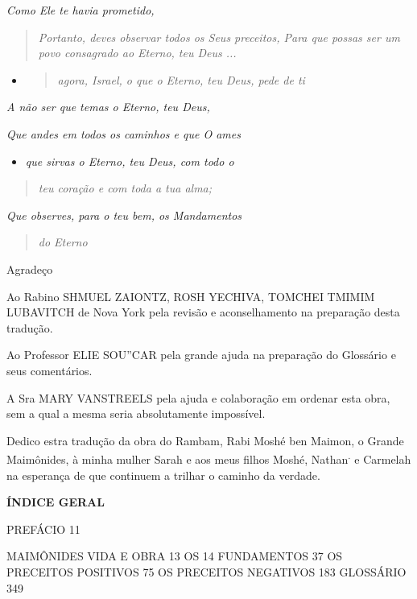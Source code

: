 \emph{Como Ele te havia prometido,}

\begin{quote}
\emph{Portanto, deves observar todos os Seus preceitos, Para que possas
ser um povo consagrado ao Eterno, teu Deus ...}
\end{quote}

\begin{itemize}
\item
  \begin{quote}
  \emph{agora, Israel, o que o Eterno, teu Deus, pede de ti}
  \end{quote}
\end{itemize}

\emph{A não ser que temas o Eterno, teu Deus,}

\emph{Que andes em todos os caminhos e que O ames}

\begin{itemize}
\item
  \emph{que sirvas o Eterno, teu Deus, com todo o}
\end{itemize}

\begin{quote}
\emph{teu coração e com toda a tua alma;}
\end{quote}

\emph{Que observes, para o teu bem, os Mandamentos}

\begin{quote}
\emph{do Eterno}
\end{quote}

Agradeço

Ao Rabino SHMUEL ZAIONTZ, ROSH YECHIVA, TOMCHEI TMIMIM LUBAVITCH de Nova
York pela revisão e aconselhamento na preparação desta tradução.

Ao Professor ELIE SOU''CAR pela grande ajuda na preparação do Glossário
e seus comentários.

A Sra MARY VANSTREELS pela ajuda e colabora­ção em ordenar esta obra,
sem a qual a mesma se­ria absolutamente impossível.

Dedico estra tradução da obra do Rambam, Rabi Moshé ben Maimon, o Grande
Maimônides, à minha mulher Sarah e aos meus filhos Moshé,
Nathan\textsuperscript{.} e Carmelah na esperança de que continuem a
trilhar o caminho da verdade.

\textbf{ÍNDICE GERAL}

PREFÁCIO 11

MAIMÔNIDES VIDA E OBRA 13 OS 14 FUNDAMENTOS 37 OS PRECEITOS POSITIVOS 75
OS PRECEITOS NEGATIVOS 183 GLOSSÁRIO 349

